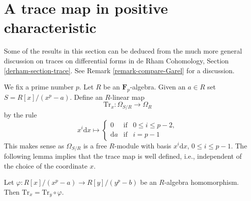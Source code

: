 \section{A trace map in positive characteristic}
\label{section-trace}

\noindent
Some of the results in this section can be deduced from the much more
general discussion on traces on differential forms in
de Rham Cohomology, Section \ref{derham-section-trace}.
See Remark \ref{remark-compare-Garel} for a discussion.

\medskip\noindent
We fix a prime number $p$. Let $R$ be an $\mathbf{F}_p$-algebra.
Given an $a \in R$ set $S = R[x]/(x^p - a)$. Define an $R$-linear map
$$
\text{Tr}_x : \Omega_{S/R} \longrightarrow \Omega_R
$$
by the rule
$$
x^i\text{d}x \longmapsto
\left\{
\begin{matrix}
0 & \text{if} & 0 \leq i \leq p - 2, \\
\text{d}a & \text{if} & i = p - 1
\end{matrix}
\right.
$$
This makes sense as $\Omega_{S/R}$ is a free $R$-module with
basis $x^i\text{d}x$, $0 \leq i \leq p - 1$.
The following lemma implies that the trace map is well defined,
i.e., independent of the choice of the coordinate $x$.

\begin{lemma}
\label{lemma-trace-well-defined}
Let $\varphi : R[x]/(x^p - a) \to R[y]/(y^p - b)$ be an $R$-algebra
homomorphism. Then $\text{Tr}_x = \text{Tr}_y \circ \varphi$.
\end{lemma}

